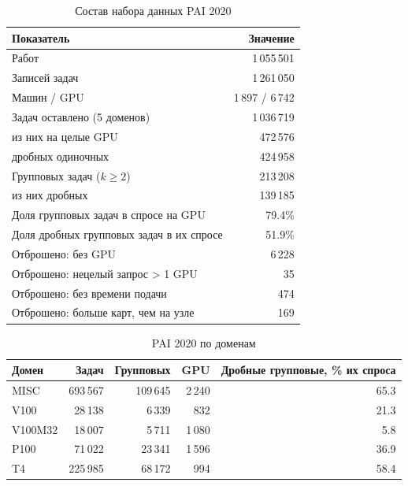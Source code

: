 \begin{table}[htbp]
\centering
\small
\caption{Состав набора данных PAI 2020}
\label{tab:paicounts}
\begin{tabular}{lr}
\toprule
Показатель & Значение \\
\midrule
Работ & 1\,055\,501 \\
Записей задач & 1\,261\,050 \\
Машин / GPU & 1\,897 / 6\,742 \\
\midrule
Задач оставлено (5 доменов) & 1\,036\,719 \\
\quad из них на целые GPU & 472\,576 \\
\quad дробных одиночных & 424\,958 \\
Групповых задач (\(k \ge 2\)) & 213\,208 \\
\quad из них дробных & 139\,185 \\
Доля групповых задач в спросе на GPU & 79.4\% \\
Доля дробных групповых задач в их спросе & 51.9\% \\
\midrule
Отброшено: без GPU & 6\,228 \\
Отброшено: нецелый запрос > 1 GPU & 35 \\
Отброшено: без времени подачи & 474 \\
Отброшено: больше карт, чем на узле & 169 \\
\bottomrule
\end{tabular}
\end{table}

\begin{table}[htbp]
\centering
\small
\caption{PAI 2020 по доменам}
\label{tab:paidomains}
\begin{tabular}{lrrrr}
\toprule
Домен & Задач & Групповых & GPU & Дробные групповые, \% их спроса \\
\midrule
MISC & 693\,567 & 109\,645 & 2\,240 & 65.3 \\
V100 & 28\,138 & 6\,339 & 832 & 21.3 \\
V100M32 & 18\,007 & 5\,711 & 1\,080 & 5.8 \\
P100 & 71\,022 & 23\,341 & 1\,596 & 36.9 \\
T4 & 225\,985 & 68\,172 & 994 & 58.4 \\
\bottomrule
\end{tabular}
\end{table}

